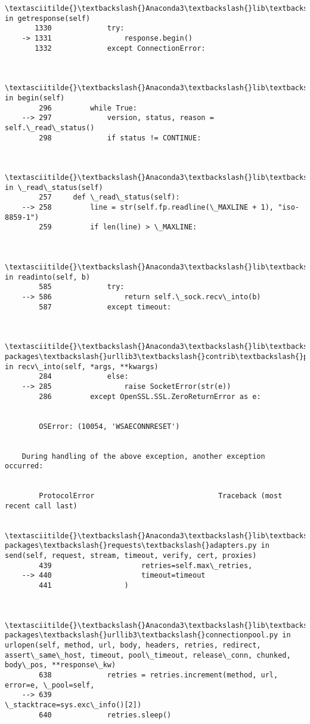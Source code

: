 \documentclass[11pt]{article}
\begin{document}
\begin{Verbatim}[commandchars=\\\{\}]
        \textasciitilde{}\textbackslash{}Anaconda3\textbackslash{}lib\textbackslash{}http\textbackslash{}client.py in getresponse(self)
       1330             try:
    -> 1331                 response.begin()
       1332             except ConnectionError:
    

        \textasciitilde{}\textbackslash{}Anaconda3\textbackslash{}lib\textbackslash{}http\textbackslash{}client.py in begin(self)
        296         while True:
    --> 297             version, status, reason = self.\_read\_status()
        298             if status != CONTINUE:
    

        \textasciitilde{}\textbackslash{}Anaconda3\textbackslash{}lib\textbackslash{}http\textbackslash{}client.py in \_read\_status(self)
        257     def \_read\_status(self):
    --> 258         line = str(self.fp.readline(\_MAXLINE + 1), "iso-8859-1")
        259         if len(line) > \_MAXLINE:
    

        \textasciitilde{}\textbackslash{}Anaconda3\textbackslash{}lib\textbackslash{}socket.py in readinto(self, b)
        585             try:
    --> 586                 return self.\_sock.recv\_into(b)
        587             except timeout:
    

        \textasciitilde{}\textbackslash{}Anaconda3\textbackslash{}lib\textbackslash{}site-packages\textbackslash{}urllib3\textbackslash{}contrib\textbackslash{}pyopenssl.py in recv\_into(self, *args, **kwargs)
        284             else:
    --> 285                 raise SocketError(str(e))
        286         except OpenSSL.SSL.ZeroReturnError as e:
    

        OSError: (10054, 'WSAECONNRESET')

        
    During handling of the above exception, another exception occurred:
    

        ProtocolError                             Traceback (most recent call last)

        \textasciitilde{}\textbackslash{}Anaconda3\textbackslash{}lib\textbackslash{}site-packages\textbackslash{}requests\textbackslash{}adapters.py in send(self, request, stream, timeout, verify, cert, proxies)
        439                     retries=self.max\_retries,
    --> 440                     timeout=timeout
        441                 )
    

        \textasciitilde{}\textbackslash{}Anaconda3\textbackslash{}lib\textbackslash{}site-packages\textbackslash{}urllib3\textbackslash{}connectionpool.py in urlopen(self, method, url, body, headers, retries, redirect, assert\_same\_host, timeout, pool\_timeout, release\_conn, chunked, body\_pos, **response\_kw)
        638             retries = retries.increment(method, url, error=e, \_pool=self,
    --> 639                                         \_stacktrace=sys.exc\_info()[2])
        640             retries.sleep()
    


\end{Verbatim}
\end{document}
